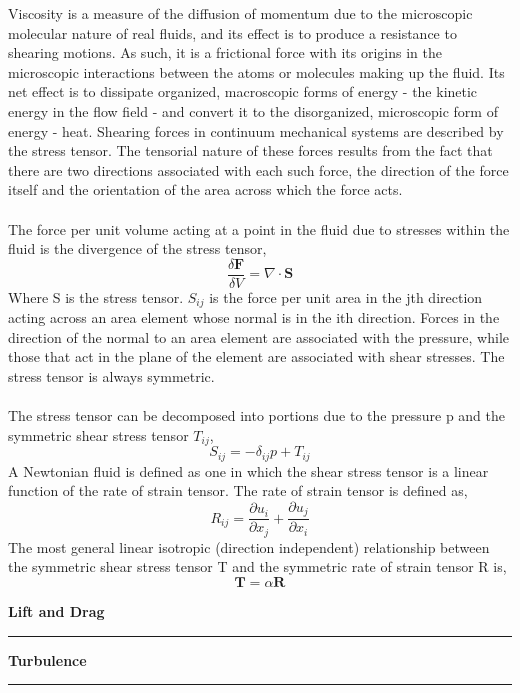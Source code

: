 \documentclass[12pt]{article}
\begin{document}
\begin{flushleft}
Viscosity is a measure of the diffusion of momentum due to the microscopic molecular nature of real fluids, and its effect is to produce a
resistance to shearing motions. As such, it is a frictional force with its
origins in the microscopic interactions between the atoms or molecules
making up the fluid. Its net effect is to dissipate organized, macroscopic
forms of energy - the kinetic energy in the flow field - and convert it to
the disorganized, microscopic form of energy - heat. Shearing forces in
continuum mechanical systems are described by the stress tensor. The
tensorial nature of these forces results from the fact that there are two
directions associated with each such force, the direction of the force itself
and the orientation of the area across which the force acts.
\\~\\
The force per unit volume acting at a point in the fluid due to
stresses within the fluid is the divergence of the stress tensor,
$$\frac{\delta\textbf{F}}{\delta V} = \nabla \cdot \textbf{S}$$
Where S is the stress tensor. $S_{ij}$ is the force per unit area in the jth direction acting
across an area element whose normal is in the ith direction. Forces in
the direction of the normal to an area element are associated with the
pressure, while those that act in the plane of the element are associated
with shear stresses. The stress tensor is always symmetric.
\\~\\
The stress tensor can be decomposed into portions due to the pressure
p and the symmetric shear stress tensor $T_{ij}$,
$$S_{ij} = -\delta_{ij}p+T_{ij}$$
A Newtonian fluid is defined as one in which the shear stress tensor is a linear function of the rate of strain tensor. The rate of strain tensor is defined as,
$$R_{ij} = \frac{\partial u_i}{\partial x_j}+\frac{\partial u_j}{\partial x_i}$$
The most general linear isotropic (direction independent) relationship
between the symmetric shear stress tensor T and the symmetric rate of strain tensor R is,
$$\textbf{T} = \alpha \textbf{R}$$


\end{flushleft}

\pagebreak

\begin{huge}
\begin{center}
\textbf{Lift and Drag}
\noindent\rule{16.5cm}{0.4pt}
\end{center}
\end{huge}

\begin{flushleft}

\end{flushleft}

\pagebreak

\begin{huge}
\begin{center}
\textbf{Turbulence}
\noindent\rule{16.5cm}{0.4pt}
\end{center}
\end{huge}

\begin{flushleft}

\end{flushleft}

\pagebreak
\end{document}
